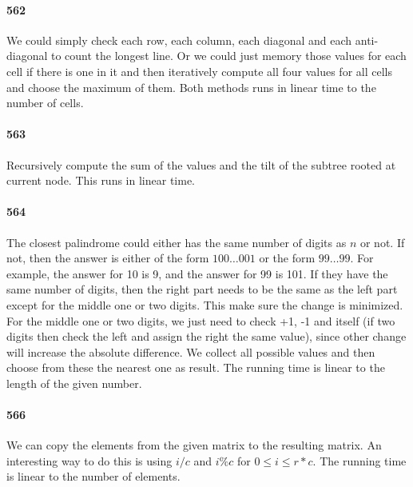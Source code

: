 \documentclass[11pt]{article}
\begin{document}
\begin{itemize}
\paragraph{562}
We could simply check each row, each column, each diagonal and each anti-diagonal to count the longest line. Or we could just
memory those values for each cell if there is one in it and then iteratively compute all four values for all cells and choose
the maximum of them. Both methods runs in linear time to the number of cells.

\paragraph{563}
Recursively compute the sum of the values and the tilt of the subtree rooted at current node. This runs in linear time.

\paragraph{564}
The closest palindrome could either has the same number of digits as $n$ or not. If not, then the answer is either of the form
$100 \dots 001$ or the form $99\dots99$. For example, the answer for 10 is 9, and the answer for 99 is 101. 
If they have the same number of digits, then the right part needs to be the same as the left part except for the middle one
or two digits. This make sure the change is minimized. For the middle one or two digits, we just need to check +1, -1 and
itself (if two digits then check the left and assign the right the same value), since other change will increase the absolute 
difference. We collect all possible values and then choose from these the nearest one as result. 
The running time is linear to the length of the given number.


\paragraph{566}
We can copy the elements from the given matrix to the resulting matrix. An interesting way to do this is using $i/c$ and $i \%
c$ for $0 \le i \le r * c$. The running time is linear to the number of elements.


\end{itemize}
\end{document}
